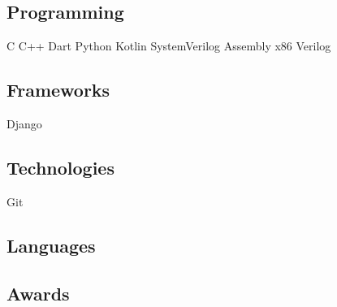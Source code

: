 \documentclass[]{deedy-resume-openfont}
\begin{document}
\begin{minipage}[t]{0.33\textwidth}
\subsection{Programming}
 C \textbullet{} C++ \textbullet{} Dart\textbullet{} Python \newline
{}
\vspace{1mm}
Kotlin \textbullet{} SystemVerilog \newline Assembly x86 \textbullet{} Verilog
\vspace{3mm} %


\subsection{Frameworks}
Django
\vspace{3mm}

\subsection{Technologies}
Git
\vspace{3mm}

\subsection{Languages}
\vspace{3mm}

\subsection{Awards}
\textbullet {}

\sectionsep



%
%

\end{minipage} 
\end{document}
